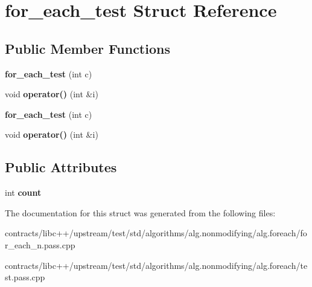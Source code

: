 \hypertarget{structfor__each__test}{}\section{for\+\_\+each\+\_\+test Struct Reference}
\label{structfor__each__test}
\subsection*{Public Member Functions}
\begin{DoxyCompactItemize}
\item 
\mbox{\label{structfor__each__test_a82a06007adda4403c3a171c66ad6a588}} 
{\bfseries for\+\_\+each\+\_\+test} (int c)
\item 
\mbox{\label{structfor__each__test_ae5d0a90db860e214fa92f30b60d9b827}} 
void {\bfseries operator()} (int \&i)
\item 
\mbox{\label{structfor__each__test_a82a06007adda4403c3a171c66ad6a588}} 
{\bfseries for\+\_\+each\+\_\+test} (int c)
\item 
\mbox{\label{structfor__each__test_ae5d0a90db860e214fa92f30b60d9b827}} 
void {\bfseries operator()} (int \&i)
\end{DoxyCompactItemize}
\subsection*{Public Attributes}
\begin{DoxyCompactItemize}
\item 
\mbox{\label{structfor__each__test_a66a4255da1b9e4df94dd7f35e8845037}} 
int {\bfseries count}
\end{DoxyCompactItemize}


The documentation for this struct was generated from the following files\+:\begin{DoxyCompactItemize}
\item 
contracts/libc++/upstream/test/std/algorithms/alg.\+nonmodifying/alg.\+foreach/for\+\_\+each\+\_\+n.\+pass.\+cpp\item 
contracts/libc++/upstream/test/std/algorithms/alg.\+nonmodifying/alg.\+foreach/test.\+pass.\+cpp\end{DoxyCompactItemize}
